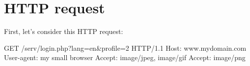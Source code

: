 
\section{HTTP request}

First, let's consider this HTTP request:
\label{HTTP request}\begin{listing}{1}
GET /serv/login.php?lang=en&profile=2 HTTP/1.1
Host: www.mydomain.com
User-agent: my small browser
Accept: image/jpeg, image/gif
Accept: image/png
\end{listing}
